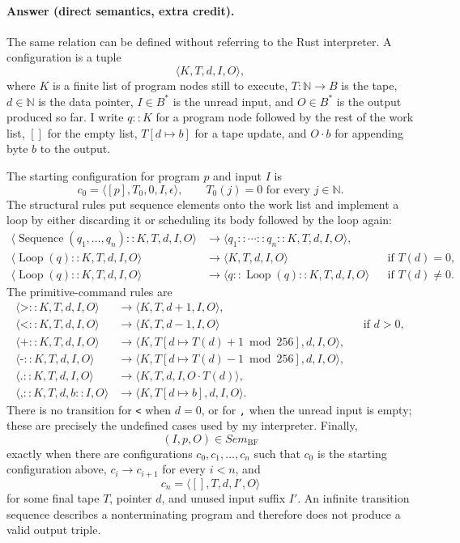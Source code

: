 \documentclass{article}
\begin{document}
\begin{enumerate}
\begin{enumerate}
\paragraph{Answer (direct semantics, extra credit).}
The same relation can be defined without referring to the Rust interpreter.
A configuration is a tuple
\[
\langle K,T,d,I,O\rangle,
\]
where $K$ is a finite list of program nodes still to execute,
$T:\mathbb{N}\to B$ is the tape, $d\in\mathbb{N}$ is the data pointer,
$I\in B^*$ is the unread input, and $O\in B^*$ is the output produced so
far.  I write $q::K$ for a program node followed by the rest of the work
list, $[]$ for the empty list, $T[d\mapsto b]$ for a tape update, and
$O\cdot b$ for appending byte $b$ to the output.

The starting configuration for program $p$ and input $I$ is
\[
c_0 = \langle [p],T_0,0,I,\epsilon\rangle,
\qquad T_0(j)=0\text{ for every }j\in\mathbb{N}.
\]
The structural rules put sequence elements onto the work list and implement
a loop by either discarding it or scheduling its body followed by the loop
again:
\[
\begin{aligned}
\langle \operatorname{Sequence}(q_1,\ldots,q_n)::K,T,d,I,O\rangle
&\to \langle q_1::\cdots::q_n::K,T,d,I,O\rangle,\\
\langle \operatorname{Loop}(q)::K,T,d,I,O\rangle
&\to \langle K,T,d,I,O\rangle &&\text{if }T(d)=0,\\
\langle \operatorname{Loop}(q)::K,T,d,I,O\rangle
&\to \langle q::\operatorname{Loop}(q)::K,T,d,I,O\rangle
&&\text{if }T(d)\ne 0.
\end{aligned}
\]
The primitive-command rules are
\[
\begin{aligned}
\langle \texttt{>}::K,T,d,I,O\rangle
&\to \langle K,T,d+1,I,O\rangle,\\
\langle \texttt{<}::K,T,d,I,O\rangle
&\to \langle K,T,d-1,I,O\rangle &&\text{if }d>0,\\
\langle \texttt{+}::K,T,d,I,O\rangle
&\to \langle K,T[d\mapsto T(d)+1\bmod 256],d,I,O\rangle,\\
\langle \texttt{-}::K,T,d,I,O\rangle
&\to \langle K,T[d\mapsto T(d)-1\bmod 256],d,I,O\rangle,\\
\langle \texttt{.}::K,T,d,I,O\rangle
&\to \langle K,T,d,I,O\cdot T(d)\rangle,\\
\langle \texttt{,}::K,T,d,b::I,O\rangle
&\to \langle K,T[d\mapsto b],d,I,O\rangle.
\end{aligned}
\]
There is no transition for \texttt{<} when $d=0$, or for \texttt{,} when
the unread input is empty; these are precisely the undefined cases used by
my interpreter.  Finally,
\[
(I,p,O)\in\mathit{Sem}_{\mathrm{BF}}
\]
exactly when there are configurations $c_0,c_1,\ldots,c_n$ such that $c_0$
is the starting configuration above, $c_i\to c_{i+1}$ for every $i<n$, and
\[
c_n=\langle [],T,d,I',O\rangle
\]
for some final tape $T$, pointer $d$, and unused input suffix $I'$.  An
infinite transition sequence describes a nonterminating program and therefore
does not produce a valid output triple.


\end{enumerate}
\end{enumerate}
\end{document}
